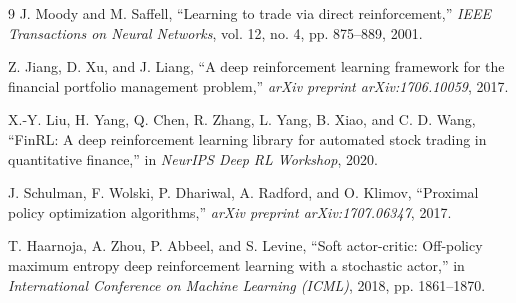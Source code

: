 \documentclass[10pt,twocolumn,conference]{IEEEtran}
\begin{document}
\begin{thebibliography}{9}
J. Moody and M. Saffell, ``Learning to trade via direct reinforcement,'' \emph{IEEE Transactions on Neural Networks}, vol. 12, no. 4, pp. 875--889, 2001.

Z. Jiang, D. Xu, and J. Liang, ``A deep reinforcement learning framework for the financial portfolio management problem,'' \emph{arXiv preprint arXiv:1706.10059}, 2017.

X.-Y. Liu, H. Yang, Q. Chen, R. Zhang, L. Yang, B. Xiao, and C. D. Wang, ``FinRL: A deep reinforcement learning library for automated stock trading in quantitative finance,'' in \emph{NeurIPS Deep RL Workshop}, 2020.

J. Schulman, F. Wolski, P. Dhariwal, A. Radford, and O. Klimov, ``Proximal policy optimization algorithms,'' \emph{arXiv preprint arXiv:1707.06347}, 2017.

T. Haarnoja, A. Zhou, P. Abbeel, and S. Levine, ``Soft actor-critic: Off-policy maximum entropy deep reinforcement learning with a stochastic actor,'' in \emph{International Conference on Machine Learning (ICML)}, 2018, pp. 1861--1870.
\end{thebibliography}
\end{document}
